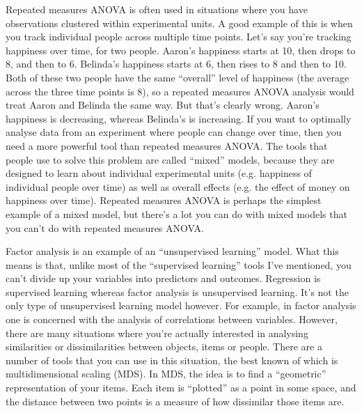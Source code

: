 \begin{itemize}
 Repeated measures ANOVA is often used in situations where you have observations clustered within experimental units. A good example of this is when you track individual people across multiple time points. Let's say you're tracking happiness over time, for two people. Aaron's happiness starts at 10, then drops to 8, and then to 6. Belinda's happiness starts at 6, then rises to 8 and then to 10. Both of these two people have the same ``overall'' level of happiness (the average across the three time points is 8), so a repeated measures ANOVA analysis would treat Aaron and Belinda the same way. But that's clearly wrong. Aaron's happiness is decreasing, whereas Belinda's is increasing. If you want to optimally analyse data from an experiment where people can change over time, then you need a more powerful tool than repeated measures ANOVA. The tools that people use to solve this problem are called ``mixed'' models, because they are designed to learn about individual experimental units (e.g. happiness of individual people over time) as well as overall effects (e.g. the effect of money on happiness over time). Repeated measures ANOVA is perhaps the simplest example of a mixed model, but there's a lot you can do with mixed models that you can't do with repeated measures ANOVA. 

 Factor analysis is an example of an ``unsupervised learning'' model. What this means is that, unlike most of the ``supervised learning'' tools I've mentioned, you can't divide up your variables into predictors and outcomes. Regression is supervised learning whereas factor analysis is unsupervised learning. It's not the only type of unsupervised learning model however. For example, in factor analysis one is concerned with the analysis of correlations between variables. However, there are many situations where you're actually interested in analysing similarities or dissimilarities between objects, items or people. There are a number of tools that you can use in this situation, the best known of which is multidimensional scaling (MDS). In MDS, the idea is to find a ``geometric'' representation of your items. Each item is ``plotted'' as a point in some space, and the distance between two points is a measure of how dissimilar those items are.    


\end{itemize}
